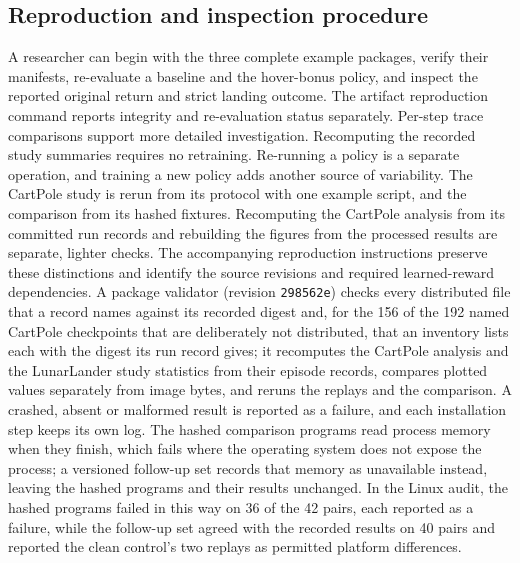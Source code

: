 \documentclass[preprint,12pt]{elsarticle}
\newcommand{\valfix}{298562e}
\begin{document}
\subsection{Reproduction and inspection procedure}\label{sec:repro}
A researcher can begin with the three complete example packages, verify their manifests, re-evaluate a baseline and the hover-bonus policy, and inspect the reported original return and strict landing outcome. The artifact reproduction command reports integrity and re-evaluation status separately. Per-step trace comparisons support more detailed investigation. Recomputing the recorded study summaries requires no retraining. Re-running a policy is a separate operation, and training a new policy adds another source of variability. The CartPole study is rerun from its protocol with one example script, and the comparison from its hashed fixtures. Recomputing the CartPole analysis from its committed run records and rebuilding the figures from the processed results are separate, lighter checks. The accompanying reproduction instructions preserve these distinctions and identify the source revisions and required learned-reward dependencies. A package validator (revision \texttt{\valfix}) checks every distributed file that a record names against its recorded digest and, for the 156 of the 192 named CartPole checkpoints that are deliberately not distributed, that an inventory lists each with the digest its run record gives; it recomputes the CartPole analysis and the LunarLander study statistics from their episode records, compares plotted values separately from image bytes, and reruns the replays and the comparison. A crashed, absent or malformed result is reported as a failure, and each installation step keeps its own log. The hashed comparison programs read process memory when they finish, which fails where the operating system does not expose the process; a versioned follow-up set records that memory as unavailable instead, leaving the hashed programs and their results unchanged. In the Linux audit, the hashed programs failed in this way on 36 of the 42 pairs, each reported as a failure, while the follow-up set agreed with the recorded results on 40 pairs and reported the clean control's two replays as permitted platform differences.
\end{document}
